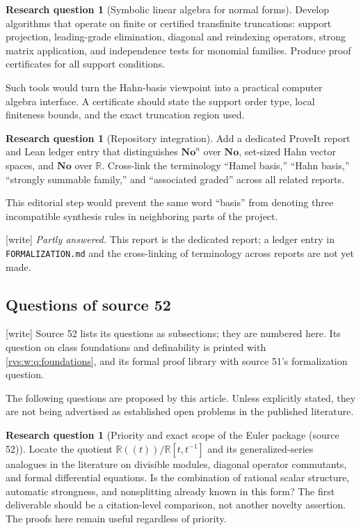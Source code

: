 \documentclass[11pt,letterpaper]{article}
\numberwithin{equation}{section}
\theoremstyle{definition}
\newtheorem{question}[theorem]{Research question}
\theoremstyle{remark}
\newcommand{\No}{\mathbf{No}}
\newcommand{\R}{\mathbb{R}}
\newcommand{\wtag}{\textup{[write]}}%
\begin{document}
\begin{question}[Symbolic linear algebra for normal forms]
Develop algorithms that operate on finite or certified transfinite
truncations: support projection, leading-grade elimination, diagonal and
reindexing operators, strong matrix application, and independence tests for
monomial families.  Produce proof certificates for all support conditions.
\end{question}

Such tools would turn the Hahn-basis viewpoint into a practical computer
algebra interface.  A certificate should state the support order type, local
finiteness bounds, and the exact truncation region used.

\begin{question}[Repository integration]
Add a dedicated ProveIt report and Lean ledger entry that distinguishes
\(\No^n\) over \(\No\), set-sized Hahn vector spaces, and \(\No\) over
\(\R\).  Cross-link the terminology ``Hamel basis,'' ``Hahn basis,''
``strongly summable family,'' and ``associated graded'' across all related
reports.
\end{question}

This editorial step would prevent the same word ``basis'' from denoting three
incompatible synthesis rules in neighboring parts of the project.

\noindent\wtag{} \emph{Partly answered.}  This report is the dedicated
report; a ledger entry in \texttt{FORMALIZATION.md} and the cross-linking of
terminology across reports are not yet made.

\subsection{Questions of source 52}

\noindent\wtag{} Source 52 lists its questions as subsections; they are
numbered here.  Its question on class foundations and definability is
printed with \cref{rvs:w:q:foundations}, and its formal proof library with
source 51's formalization question.

The following questions are proposed by this article. Unless explicitly stated, they are not being advertised as established open problems in the published literature.
\begin{question}[Priority and exact scope of the Euler package (source 52)]
Locate the quotient $\R((t))/\R[t,t^{-1}]$ and its generalized-series analogues in the literature on divisible modules, diagonal operator commutants, and formal differential equations. Is the combination of rational scalar structure, automatic strongness, and nonsplitting already known in this form? The first deliverable should be a citation-level comparison, not another novelty assertion. The proofs here remain useful regardless of priority.
\end{question}
\end{document}

